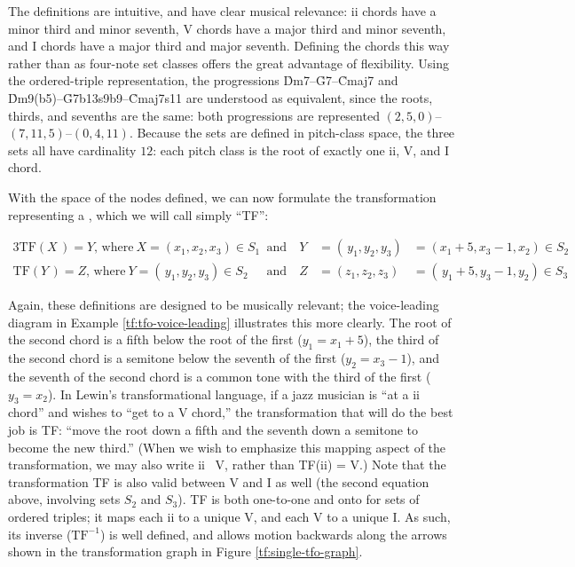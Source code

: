\noindent The definitions are intuitive, and have clear musical relevance:
ii chords have a minor third and minor seventh, V chords have
a major third and minor seventh, and I chords have a major third and
major seventh. Defining the chords this way rather than as four-note set
classes offers the great advantage of flexibility. Using the ordered-triple
representation, the progressions \h{Dm7}--\h{G7}--\h{Cmaj7} and
\h{Dm9(b5)}--\h{G7b13s9b9}--\h{Cmaj7s11} are understood as equivalent, since
the roots, thirds, and sevenths are the same: both progressions are
represented $(2, 5, 0)$--\allowbreak$(7, 11, 5)$--\allowbreak$(0, 4,
11)$. Because the sets are defined in pitch-class space, the three sets all
have cardinality $12$: each pitch class is the root of exactly one ii,
V, and I chord.

With the space of the nodes defined, we can now formulate the transformation
representing a \tf, which we will call simply ``TF'':

\vspace{-3em} %
\begin{alignat*}{3}
    \mathrm{TF}(X\,) = Y\text{, where}\ X = (x_1, x_2, x_3) \in S_1
    & \text{ and}\ &
    Y &= (\,y_1, y_2, y_3) &= (x_1 + 5, x_3 - 1, x_2) \in S_2 \\
    \mathrm{TF}(Y\,) = Z\text{, where}\ Y = (\,y_1, y_2, y_3) \in S_2
    & \text{ and} &
    Z &= (z_1, z_2, z_3) &= (\,y_1 + 5, y_3 - 1, y_2) \in S_3
\end{alignat*}
\vspace{-3em}

\noindent Again, these definitions are designed to be musically relevant; the
voice-leading diagram in Example \ref{tf:tfo-voice-leading} illustrates this
more clearly. The root of the second chord is a fifth below the root of the
first ($y_1 = x_1 + 5$), the third of the second chord is a semitone below the
seventh of the first ($y_2 = x_3 - 1$), and the seventh of the second chord is
a common tone with the third of the first ($y_3 = x_2$). In Lewin's
transformational language, if a jazz musician is ``at a ii chord'' and
wishes to ``get to a V chord,'' the transformation that will do the
best job is TF: ``move the root down a fifth and the seventh down a semitone
to become the new third.'' (When we wish to emphasize this mapping
aspect of the transformation, we may also write ii
\TFarrow\ V, rather than TF(ii) = V.)
Note that the transformation TF is also valid
between V and I as well (the second equation above,
involving sets $S_2$ and $S_3$). TF is both one-to-one and onto for sets of
ordered triples; it maps each ii to a unique V, and each
V to a unique I. As such, its inverse ($\mathrm{TF}^{-1}$) is
well defined, and allows motion backwards along the arrows shown in the
transformation graph in Figure \ref{tf:single-tfo-graph}.

